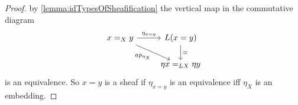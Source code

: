 \begin{proof}

	by \ref{lemma:idTypesOfSheafification} the vertical map in the commutative diagram
	\[\begin{tikzcd}
		{x =_X y} & {L(x=y)} \\
		& {\eta x =_{LX} \eta y}
		\arrow["{\eta_{x=y}}", from=1-1, to=1-2]
		\arrow["{ap_{\eta_X}}"', from=1-1, to=2-2]
		\arrow["\simeq", from=1-2, to=2-2]
	\end{tikzcd}\]
is an equivalence.
	So $x = y$ is a sheaf if $\eta_{x=y}$ is an equivalence iff $\eta_X$ is an embedding.
\end{proof}